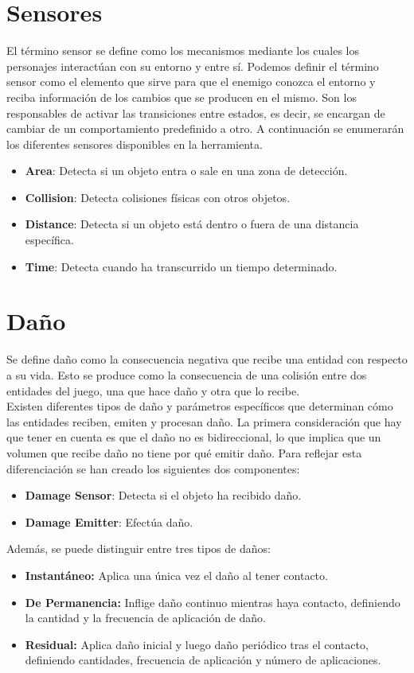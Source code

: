 \section{Sensores}
\label{subsec:sensores}
El término sensor se define como los mecanismos mediante los cuales los personajes interactúan con su entorno y entre sí.
Podemos definir el término sensor como el elemento que sirve para que el enemigo conozca el entorno y reciba información de los cambios que se producen en el mismo. Son los responsables de activar las transiciones entre estados, es decir, se encargan de cambiar de un comportamiento predefinido a otro.
A continuación se enumerarán los diferentes sensores disponibles en la herramienta.
\begin{itemize}
    \item \textbf{Area}: Detecta si un objeto entra o sale en una zona de detección.
    \item \textbf{Collision}: Detecta colisiones físicas con otros objetos.
    \item \textbf{Distance}: Detecta si un objeto está dentro o fuera de una distancia específica.
    \item \textbf{Time}: Detecta cuando ha transcurrido un tiempo determinado.
\end{itemize}
\section{Daño}
Se define daño como la consecuencia negativa que recibe una entidad con respecto a su vida. Esto se produce como la consecuencia de una colisión entre dos entidades del juego, una que hace daño y otra que lo recibe.\\
Existen diferentes tipos de daño y parámetros específicos que determinan cómo las entidades reciben, emiten y procesan daño.
La primera consideración que hay que tener en cuenta es que el daño no es bidireccional, lo que implica que un volumen que recibe daño no tiene por qué emitir daño. Para reflejar esta diferenciación se han creado los siguientes dos componentes:
\begin{itemize}
    \item \textbf{Damage Sensor}: Detecta si el objeto ha recibido daño.
    \item \textbf{Damage Emitter}: Efectúa daño.
\end{itemize}

Además, se puede distinguir entre tres tipos de daños:
\begin{itemize}
    \item \textbf{Instantáneo:} Aplica una única vez el daño al tener contacto.
    \item \textbf{De Permanencia:} Inflige daño continuo mientras haya contacto, definiendo la cantidad y la frecuencia de aplicación de daño.
    \item \textbf{Residual:} Aplica daño inicial y luego daño periódico tras el contacto, definiendo cantidades, frecuencia de aplicación y número de aplicaciones.
\end{itemize}

